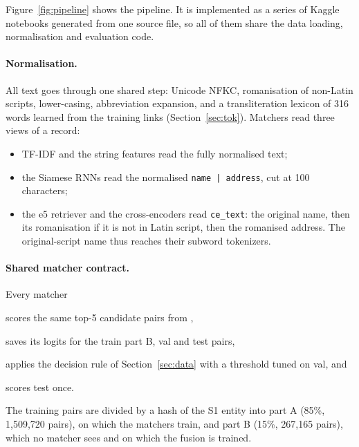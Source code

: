 Figure~\ref{fig:pipeline} shows the pipeline. It is implemented as a series of Kaggle notebooks generated
from one source file, so all of them share the data loading, normalisation and evaluation code.

\paragraph{Normalisation.} All text goes through one shared step: Unicode NFKC, romanisation of
non-Latin scripts, lower-casing, abbreviation expansion, and a transliteration lexicon of 316 words learned
from the training links (Section~\ref{sec:tok}). Matchers read three views of a record:
\begin{itemize}
  \item TF-IDF and the string features read the fully normalised text;
  \item the Siamese RNNs read the normalised \texttt{name | address}, cut at 100 characters;
  \item the e5 retriever and the cross-encoders read \texttt{ce\_text}: the original name, then its
        romanisation if it is not in Latin script, then the romanised address. The original-script name
        thus reaches their subword tokenizers.
\end{itemize}

\paragraph{Shared matcher contract.} Every matcher
\begin{enumerate*}[label=(\roman*)]
  \item scores the same top-5 candidate pairs from ,
  \item saves its logits for the train part B, val and test pairs,
  \item applies the decision rule of Section~\ref{sec:data} with a threshold tuned on val, and
  \item scores test once.
\end{enumerate*}
The training pairs are divided by a hash of the S1 entity into part A (85\%, 1,509,720 pairs), on which
the matchers train, and part B (15\%, 267,165 pairs), which no matcher sees and on which the fusion is
trained.
